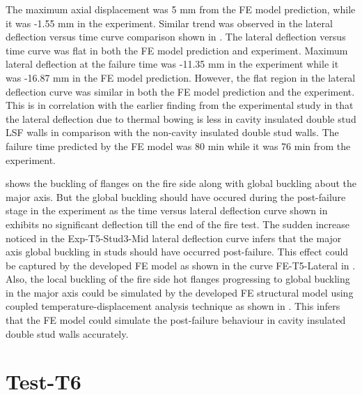 The maximum axial displacement was 5 mm from the FE model prediction, while it was -1.55 mm in the experiment. Similar trend was observed in the lateral deflection versus time curve comparison shown in . The lateral deflection versus time curve was flat in both the FE model prediction and experiment. Maximum lateral deflection at the failure time was -11.35 mm in the experiment while it was -16.87 mm in the FE model prediction. However, the flat region in the lateral deflection curve was similar in both the FE model prediction and the experiment. This is in correlation with the earlier finding from the experimental study in  that the lateral deflection due to thermal bowing is less in cavity insulated double stud LSF walls in comparison with the non-cavity insulated double stud walls. The failure time predicted by the FE model was 80 min while it was 76 min from the experiment.  

 shows the buckling of flanges on the fire side along with global buckling about the major axis. But the global buckling should have occured during the post-failure stage in the experiment as the time versus lateral deflection curve shown in  exhibits no significant deflection till the end of the fire test. The sudden increase noticed in the Exp-T5-Stud3-Mid lateral deflection curve infers that the major axis global buckling in studs should have occurred post-failure. This effect could be captured by the developed FE model as shown in the curve FE-T5-Lateral in . Also, the local buckling of the fire side hot flanges progressing to global buckling in the major axis could be simulated by the developed FE structural model using coupled temperature-displacement analysis technique as shown in . This infers that the FE model could simulate the post-failure behaviour in cavity insulated double stud walls accurately.

\section*{Test-T6}

